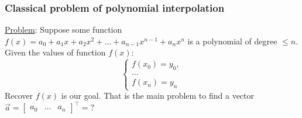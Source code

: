 \subsubsection*{Classical problem of polynomial interpolation}
\underline{Problem}: Suppose some function $f(x) = a_0 + a_1x + a_2x^2 + \ldots + a_{n-1}x^{n-1} + a_{n} x^n$ is a polynomial of degree $\leq n$. Given the values of function $f(x)$:
\[
    \left\{ \begin{array}{c}
        f(x_0) = y_0, \\
        \ldots \\
        f(x_n) = y_n
    \end{array}\right.  
\]
Recover $f(x)$ is our goal. That is the main problem to find a vector $\vec{a} = \begin{bmatrix}
    a_0 & \ldots & a_n
\end{bmatrix}^\intercal = ?$
\vspace*{0.5cm}

